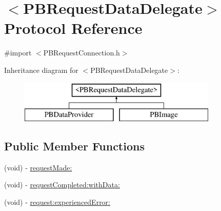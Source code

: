 \hypertarget{protocol_p_b_request_data_delegate-p}{
\section{$<$PBRequestDataDelegate$>$ Protocol Reference}
\label{protocol_p_b_request_data_delegate-p}
}


{\ttfamily \#import $<$PBRequestConnection.h$>$}

Inheritance diagram for $<$PBRequestDataDelegate$>$:\begin{figure}[H]
\begin{center}
\leavevmode
\includegraphics[height=2cm]{protocol_p_b_request_data_delegate-p}
\end{center}
\end{figure}
\subsection*{Public Member Functions}
\begin{DoxyCompactItemize}
\item 
(void) -\/ \hyperlink{protocol_p_b_request_data_delegate-p_a611a767feb6d909f711af3edbfbcac71}{requestMade:}
\item 
(void) -\/ \hyperlink{protocol_p_b_request_data_delegate-p_a8c470348d27d13f5d8784b65c8989e95}{requestCompleted:withData:}
\item 
(void) -\/ \hyperlink{protocol_p_b_request_data_delegate-p_ac1ed08e62e6d22f177e90a8ffa2529e7}{request:experiencedError:}
\end{DoxyCompactItemize}


